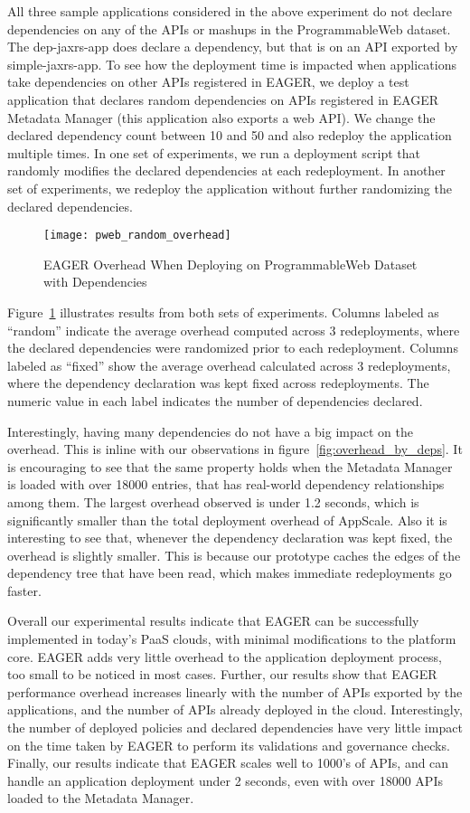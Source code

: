 All three sample applications considered in the above experiment do not declare dependencies on any of the APIs or mashups in the ProgrammableWeb
dataset. The dep-jaxrs-app does declare a dependency, but that is on an API exported by simple-jaxrs-app. To see how the deployment time is impacted
when applications take dependencies on other APIs registered in EAGER, we deploy a test application that declares random dependencies on APIs
registered in EAGER Metadata Manager (this application also exports a web API). We change the declared dependency count between 
10 and 50 and also redeploy the application multiple times.
In one set of experiments, we run a deployment script that randomly modifies the declared dependencies at each redeployment. In another set of 
experiments, we redeploy the application without further randomizing the declared dependencies.

\begin{figure}
\centering
\texttt{[image: pweb\_random\_overhead]}
\caption{EAGER Overhead When Deploying on ProgrammableWeb Dataset with Dependencies}
\label{fig:pweb_random_overhead}
\end{figure}

Figure~\ref{fig:pweb_random_overhead} illustrates results from both sets of experiments. Columns labeled as ``random'' indicate the average overhead
computed across 3 redeployments, where the declared dependencies were randomized prior to each redeployment. Columns labeled as ``fixed'' show
the average overhead calculated across 3 redeployments, where the dependency declaration was kept fixed across redeployments. The numeric value
in each label indicates the number of dependencies declared.

Interestingly, having many dependencies do not have a big impact on the overhead. This is inline with our observations in figure~\ref{fig:overhead_by_deps}.
It is encouraging to see that the same property holds when the Metadata Manager is loaded with over 18000 entries, that has real-world dependency
relationships among them. The largest overhead observed is under 1.2 seconds, which is significantly smaller than the total deployment overhead of AppScale.
Also it is interesting to see that, whenever the dependency declaration was kept fixed, the overhead is slightly smaller. This is because our prototype caches
the edges of the dependency tree that have been read, which makes immediate redeployments go faster.

Overall our experimental results indicate that EAGER can be successfully implemented in today's PaaS clouds, with minimal modifications to the platform core.
EAGER adds very little overhead to the application deployment process, too small to be noticed in most cases. Further, our results show that EAGER
performance overhead increases linearly with the number of APIs exported by the applications, and the number of APIs already deployed in the cloud. 
Interestingly, the number of deployed policies and declared dependencies
have very little impact on the time taken by EAGER to perform its validations and governance checks. Finally, our results indicate that EAGER scales
well to 1000's of APIs, and can handle an application deployment under 2 seconds, even with over 18000 APIs loaded to the Metadata Manager.